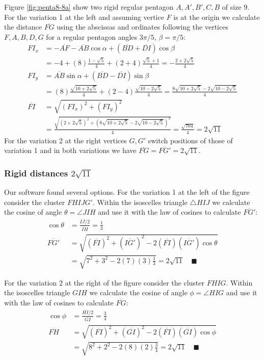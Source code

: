 \documentclass[11pt]{article}
\begin{document}
Figure \ref{fig:penta8-8a} show two rigid regular pentagon $A,A',B',C,B$ of size $9$. For the variation 1 at the left and assuming vertice $F$ is at the origin we calculate the distance $\overline{FG}$ using the abscissas and ordinates following the vertices $F,A,B,D,G$ for a regular pentagon angles $3\pi/5$, $\beta=\pi/5$:
\begin{align}
FI_x &= -\overline{AF} - \overline{AB}\cos\alpha + (\overline{BD} + \overline{DI})\cos\beta\nonumber\\
 &= -4 + (8)\frac{1-\sqrt5}4 + (2+4)\frac{\sqrt5+1}4 = -\frac{2+2\sqrt5}4\\
FI_y &= \overline{AB}\sin\alpha + (\overline{BD}-\overline{DI})\sin\beta\nonumber\\
 &= (8)\frac{\sqrt{10+2\sqrt5}}4 + (2-4)\frac{\sqrt{10-2\sqrt5}}4
 = \frac{8\sqrt{10+2\sqrt5} - 2\sqrt{10-2\sqrt5}}4\\
\overline{FI} &= \sqrt{(FI_x)^2 + (FI_y)^2}\nonumber\\
 &= \frac{\sqrt{(2+2\sqrt5)^2 + (8\sqrt{10+2\sqrt5} - 2\sqrt{10-2\sqrt5})^2}}4
 = \frac{\sqrt{704}}4 = 2\sqrt{11}
\end{align}
For the variation 2 at the right vertices $G,G'$ switch positions of those of variation 1 and in both variations we have $\overline{FG} = \overline{FG'} = 2\sqrt{11}$.


\subsubsection{Rigid distances $2\sqrt{11}$}

Our software found several options. For the variation 1 at the left of the figure consider the cluster $FHIJG'$. Within the isoscelles triangle $\triangle{HIJ}$ we calculate the cosine of angle $\theta = \angle{JIH}$ and use it with the law of cosines to calculate $\overline{FG'}$:
\begin{align}
\cos\theta &= \frac{\overline{IJ}/2}{\overline{IH}} = \frac{1}3 \nonumber\\
\overline{FG'} &= \sqrt{(\overline{FI})^2 + (\overline{IG'})^2 
 - 2(\overline{FI})(\overline{IG'})\cos\theta} \nonumber\\
 &= \sqrt{7^2 + 3^2 - 2(7)(3)\frac{1}3} = 2\sqrt{11} \quad\blacksquare
\end{align}

For the variation 2 at the right of the figure consider the cluster $FHIG$. Within the isoscelles triangle $GIH$ we calculate the cosine of angle $\phi = \angle{HIG}$ and use it with the law of cosines to calculate $\overline{FG}$:
\begin{align}
\cos\phi &= \frac{\overline{HI}/2}{\overline{GI}} = \frac{3}4 \nonumber\\
\overline{FH} &= \sqrt{(\overline{FI})^2 + (\overline{GI})^2
 - 2(\overline{FI})(\overline{GI})\cos\phi} \nonumber\\
 &= \sqrt{8^2 + 2^2 - 2(8)(2)\frac{3}4} = 2\sqrt{11} \quad\blacksquare
\end{align}
\end{document}
